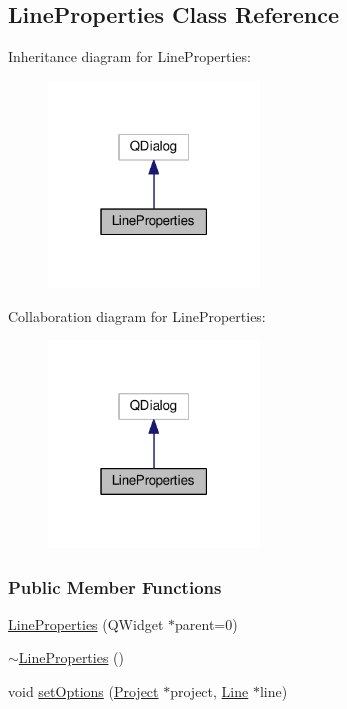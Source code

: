 \hypertarget{class_line_properties}{}\subsection{Line\+Properties Class Reference}
\label{class_line_properties}


Inheritance diagram for Line\+Properties\+:
\nopagebreak
\begin{figure}[H]
\begin{center}
\leavevmode
\includegraphics[width=159pt]{class_line_properties__inherit__graph}
\end{center}
\end{figure}


Collaboration diagram for Line\+Properties\+:
\nopagebreak
\begin{figure}[H]
\begin{center}
\leavevmode
\includegraphics[width=159pt]{class_line_properties__coll__graph}
\end{center}
\end{figure}
\subsubsection*{Public Member Functions}
\begin{DoxyCompactItemize}
\item 
\hyperlink{class_line_properties_a0bc0d7c02db0a4ea920d040f76679fec}{Line\+Properties} (Q\+Widget $\ast$parent=0)
\item 
\hyperlink{class_line_properties_a59017a6580f2e02dc492522d9267de29}{$\sim$\+Line\+Properties} ()
\item 
void \hyperlink{class_line_properties_ad434fc8e65787648a44737fb9f46b475}{set\+Options} (\hyperlink{class_project}{Project} $\ast$project, \hyperlink{class_line}{Line} $\ast$line)
\end{DoxyCompactItemize}


